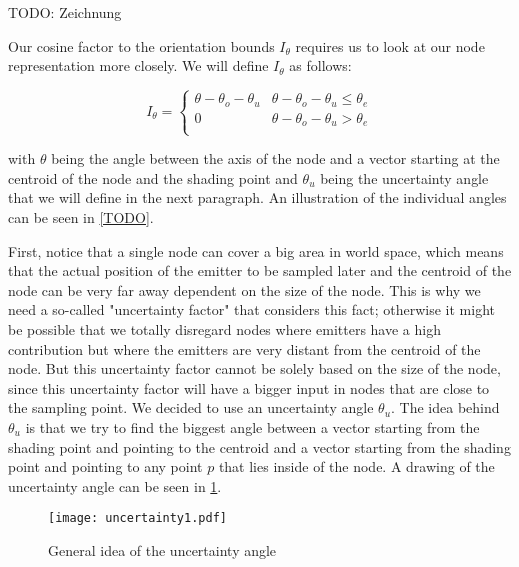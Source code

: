 TODO: Zeichnung

Our cosine factor to the orientation bounds $I_\theta$ requires us to look at our node representation more closely. We will define $I_\theta$ as follows:

\begin{equation}
\label{eq:imp}
I_\theta = \begin{cases} 
\theta - \theta_o - \theta_u & \theta - \theta_o - \theta_u \leq \theta_e \\
0 & \theta - \theta_o - \theta_u > \theta_e \\
\end{cases}
\end{equation}

with $\theta$ being the angle between the axis of the node and a vector starting at the centroid of the node and the shading point and $\theta_u$ being the uncertainty angle that we will define in the next paragraph. An illustration of the individual angles can be seen in \ref{TODO}.

First, notice that a single node can cover a big area in world space, which means that the actual position of the emitter to be sampled later and the centroid of the node can be very far away dependent on the size of the node. This is why we need a so-called "uncertainty factor" that considers this fact; otherwise it might be possible that we totally disregard nodes where emitters have a high contribution but where the emitters are very distant from the centroid of the node. But this uncertainty factor cannot be solely based on the size of the node, since this uncertainty factor will have a bigger input in nodes that are close to the sampling point. We decided to use an uncertainty angle $\theta_u$. The idea behind $\theta_u$ is that we try to find the biggest angle between a vector starting from the shading point and pointing to the centroid and a vector starting from the shading point and pointing to any point $p$ that lies inside of the node. A drawing of the uncertainty angle can be seen in \ref{fig:uncertainty1}.

\begin{figure}
	\begin{center}
		\texttt{[image: uncertainty1.pdf]}
		\caption{General idea of the uncertainty angle}
		\label{fig:uncertainty1}
	\end{center}
\end{figure}

